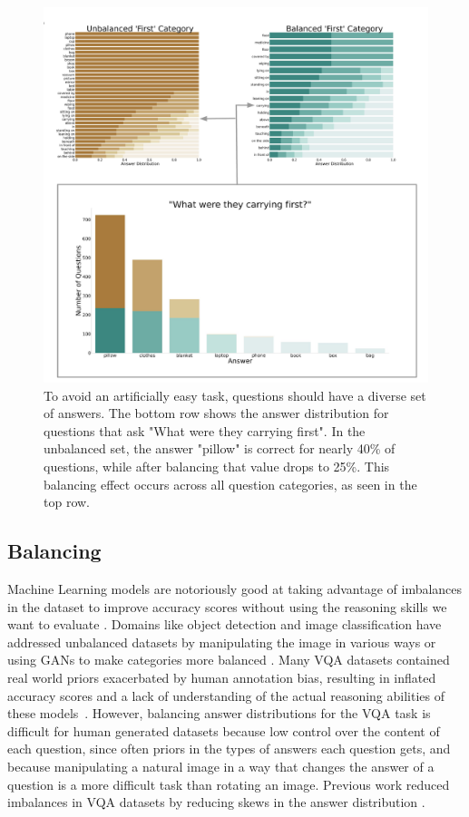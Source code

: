 \begin{figure}[t]
    \centering
    \includegraphics[width=0.95\linewidth]{figures/balance first.pdf}
    \caption{To avoid an artificially easy task, questions should have a diverse set of answers. The bottom row shows the answer distribution for questions that ask "What were they carrying first". In the unbalanced set, the answer "pillow" is correct for nearly 40\% of questions, while after balancing that value drops to 25\%. This balancing effect occurs across all question categories, as seen in the top row.}
    \label{fig:balancefirst}
\end{figure}


\subsection{Balancing}

Machine Learning models are notoriously good at taking advantage of imbalances in the dataset to improve accuracy scores without using the reasoning skills we want to evaluate \cite{hudson2019gqa, goyal2017making, johnson2017clevr, mariani2018bagan, shorten2019survey}. Domains like object detection and image classification have addressed unbalanced datasets by manipulating the image in various ways or using GANs to make categories more balanced \cite{mariani2018bagan, shorten2019survey}. Many VQA datasets contained real world priors exacerbated by human annotation bias, resulting in inflated accuracy scores and a lack of understanding of the actual reasoning abilities of these models~\cite{goyal2017making,hudson2019gqa}. However, balancing answer distributions for the VQA task is difficult for human generated datasets because low control over the content of each question, since often priors in the types of answers each question gets, and because manipulating a natural image in a way that changes the answer of a question is a more difficult task than rotating an image. Previous work reduced imbalances in VQA datasets by reducing skews in the answer distribution \cite{hudson2019gqa, goyal2017making, johnson2017clevr}.

